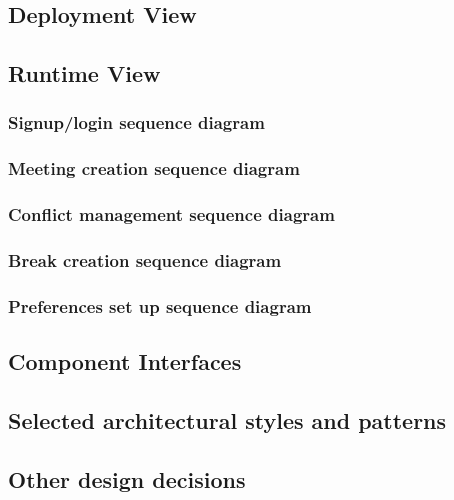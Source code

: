 \documentclass{article}
\begin{document}
\subsection{Deployment View}\label{deploymentview}

\clearpage

\subsection{Runtime View}\label{runtimeview}
\subsubsection{Signup/login sequence diagram}


\clearpage
\subsubsection{Meeting creation sequence diagram}


\clearpage
\subsubsection{Conflict management sequence diagram}


\clearpage
\subsubsection{Break creation sequence diagram}


\clearpage
\subsubsection{Preferences set up sequence diagram}


\clearpage

\subsection{Component Interfaces}\label{componentinterfaces}

\subsection{Selected architectural styles and patterns}\label{archstyles}


\subsection{Other design decisions}\label{otherdecisions}
\end{document}
